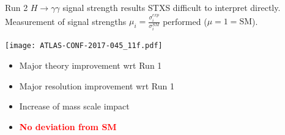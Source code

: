 \begin{frame}{Run 2 $H\rightarrow \gamma\gamma$ signal strength results}
  STXS difficult to interpret directly.\\
  Measurement of signal strengths $\mu_i = \frac{\sigma_i^{exp}}{\sigma_i^{SM}}$  performed ($\mu=1=\text{SM}$).\\

  \begin{minipage}{0.49\linewidth}
    \texttt{[image: ATLAS-CONF-2017-045\_11f.pdf]}
  \end{minipage}
  \hfill
  \begin{minipage}{0.49\linewidth}
    \centering

  \end{minipage}

  \begin{center}
  \begin{minipage}{0.62\linewidth}
    \begin{itemize}
    \item Major theory improvement wrt Run 1
    \item Major resolution improvement wrt Run 1
    \item Increase of mass scale impact
    \item   \textcolor{red}{\bf No deviation from SM}
      \end{itemize}
  \end{minipage}

  \end{center}
\end{frame}

